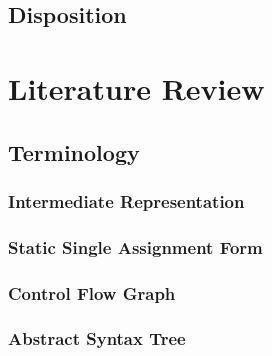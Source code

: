 \documentclass[12pt, a4paper]{article}
\begin{document}
\subsection{Disposition}



\section{Literature Review}


\subsection{Terminology}



\subsubsection{Intermediate Representation}


\subsubsection{Static Single Assignment Form}

\cite{ssa_decomp}



\subsubsection{Control Flow Graph}


\subsubsection{Abstract Syntax Tree}
\end{document}
